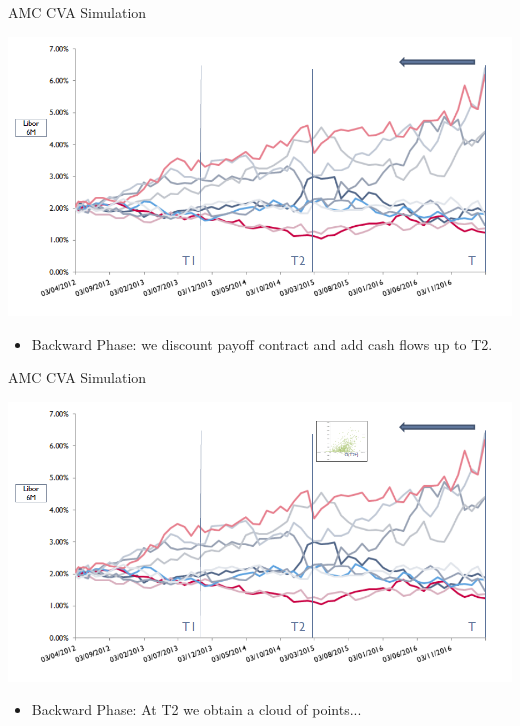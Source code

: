 \documentclass[11pt]{beamer}
\begin{document}
\begin{frame}{AMC CVA Simulation}
\begin{center}
\includegraphics[scale=.4]{img/AMC3.PNG} 
\end{center}
\begin{itemize}
\scriptsize
\item Backward Phase: we discount payoff contract and add cash flows up to T2. 
\normalsize
\end{itemize}
\end{frame}
\begin{frame}{AMC CVA Simulation}
\begin{center}
\includegraphics[scale=.4]{img/AMC4.PNG} 
\end{center}
\begin{itemize}
\scriptsize
\item Backward Phase: At T2 we obtain a cloud of points... 
\normalsize
\end{itemize}
\end{frame}
\end{document}
